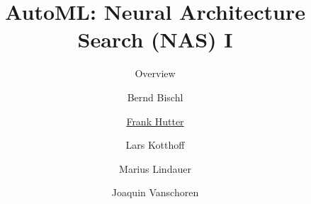 
\usepackage{pdfpages}

\title[AutoML: NAS]{AutoML: Neural Architecture Search (NAS) I} 
\subtitle{Overview}
\author[Marius Lindauer]{Bernd Bischl \and \underline{Frank Hutter} \and Lars Kotthoff\newline \and Marius Lindauer \and Joaquin Vanschoren}
\institute{}
\date{}










